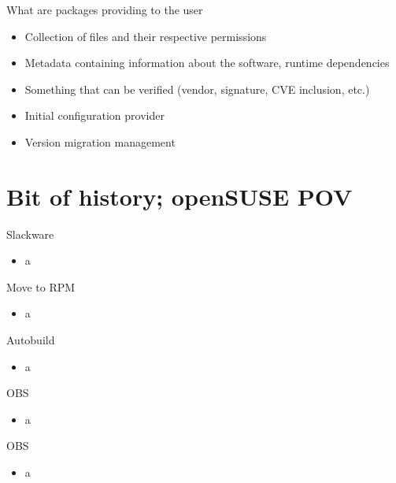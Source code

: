 \documentclass{beamer}
\begin{document}
\begin{frame}[t]{What are packages providing to the user}
	\begin{itemize}
	\item Collection of files and their respective permissions
	\item Metadata containing information about the software, runtime dependencies
	\item Something that can be verified (vendor, signature, CVE inclusion, etc.)
	\item Initial configuration provider
	\item Version migration management
	\end{itemize}
\end{frame}

\section{Bit of history; openSUSE POV}

\begin{frame}[t]{Slackware}
	\begin{itemize}
	\item a
	\end{itemize}
\end{frame}

\begin{frame}[t]{Move to RPM}
	\begin{itemize}
	\item a
	\end{itemize}
\end{frame}

\begin{frame}[t]{Autobuild}
	\begin{itemize}
	\item a
	\end{itemize}
\end{frame}

\begin{frame}[t]{OBS}
	\begin{itemize}
	\item a
	\end{itemize}
\end{frame}

\begin{frame}[t]{OBS}
        \begin{itemize}
        \item a
        \end{itemize}
\end{frame}
\end{document}
